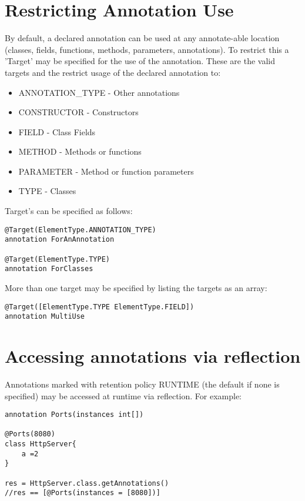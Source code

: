 \documentclass[conc-doc]{subfiles}
\begin{document}
\section{Restricting Annotation Use}
By default, a declared annotation can be used at any annotate-able location (classes, fields, functions, methods, parameters, annotations). To restrict this a 'Target' may be specified for the use of the annotation. These are the valid targets and the restrict usage of the declared annotation to:

\begin{itemize}
	\item ANNOTATION\_TYPE - Other annotations
	\item CONSTRUCTOR - Constructors
	\item FIELD - Class Fields
	\item METHOD - Methods or functions 
	\item PARAMETER - Method or function parameters
	\item TYPE - Classes
\end{itemize}

Target's can be specified as follows:

\begin{lstlisting}
@Target(ElementType.ANNOTATION_TYPE)
annotation ForAnAnnotation

@Target(ElementType.TYPE)
annotation ForClasses
\end{lstlisting}

More than one target may be specified by listing the targets as an array:

\begin{lstlisting}
@Target([ElementType.TYPE ElementType.FIELD])
annotation MultiUse
\end{lstlisting}

\section{Accessing annotations via reflection}
Annotations marked with retention policy RUNTIME (the default if none is specified) may be accessed at runtime via reflection. For example:

\begin{lstlisting}
annotation Ports(instances int[])

@Ports(8080)
class HttpServer{
	a =2
}

res = HttpServer.class.getAnnotations()
//res == [@Ports(instances = [8080])]
\end{lstlisting}
\end{document}
